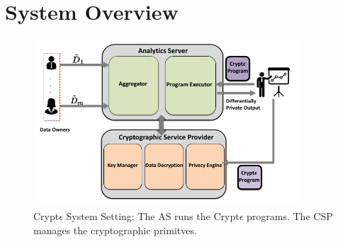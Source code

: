 
\section{System Overview} \begin{figure}\includegraphics[height=6.25cm,width=10cm]{cry.png} \caption{ Crypt$\epsilon$ System Setting: The  \textsf{AS} runs the Crypt$\epsilon$ programs. The \textsf{CSP} manages the cryptographic primitves. } \end{figure}

